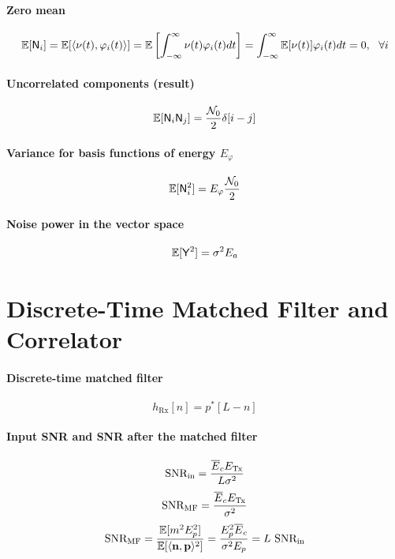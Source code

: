 \paragraph{Zero mean}
\begin{equation}
\mathbb{E}[{\mathsf N}_i]=\mathbb{E}[\langle \nu(t), \varphi_i(t) \rangle] = \mathbb{E} \left[ \int_{-\infty}^{\infty} \nu(t)\varphi_i(t) dt \right]=\int_{-\infty}^{\infty} \mathbb{E}[\nu(t)]\varphi_i(t) dt=0, \textrm{~~}\forall i
\label{eq:wgnMeanIsZero}
\end{equation}

\paragraph{Uncorrelated components (result)}
\[
\mathbb{E}[{\mathsf N}_i {\mathsf N}_j] = \frac{{\cal N}_0}{2} \delta[i-j]
\]

\paragraph{Variance for basis functions of energy $E_{\varphi}$}
\begin{equation}
\mathbb{E}[{\mathsf N}_i^2] = E_{\varphi} \frac{{\cal N}_0}{2}
\label{eq:filteredAWGNNotUnitaryEnergy}
\end{equation}

\paragraph{Noise power in the vector space}
\[
\mathbb{E}[{\mathsf Y}^2] = \sigma^2 E_a
\]

\section*{Discrete-Time Matched Filter and Correlator}

\paragraph{Discrete-time matched filter}
\[
h_{\textrm{Rx}}[n]=p^*[L-n]
\]

\paragraph{Input SNR and SNR after the matched filter}
\[
{\textrm{SNR}}_{\textrm{in}} = \frac{\overline{E}_c E_{\textrm{Tx}}}{L \sigma^2}
\]
\[
{\textrm{SNR}}_{\textrm{MF}} = \frac{\overline E_c E_{\textrm{Tx}}}{\sigma^2}
\]
\[
{\textrm{SNR}}_{\textrm{MF}} = \frac{\mathbb{E}[ m^2 E_p^2]}{\mathbb{E}[\langle{\textbf n},{\textbf p} \rangle ^2]} = \frac{E_p^2 \overline E_c}{\sigma^2 E_p} = L \textrm{~} {\textrm{SNR}}_{\textrm{in}}
\]

